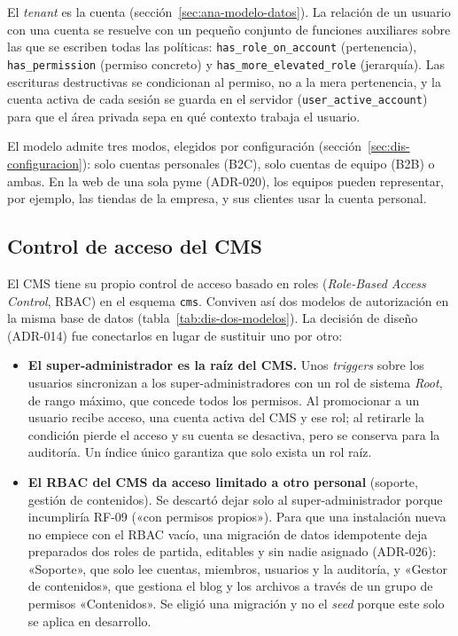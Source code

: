 El \textit{tenant} es la cuenta (sección~\ref{sec:ana-modelo-datos}). La
relación de un usuario con una cuenta se resuelve con un pequeño conjunto de
funciones auxiliares sobre las que se escriben todas las políticas:
\texttt{has\_role\_on\_account} (pertenencia), \texttt{has\_permission}
(permiso concreto) y \texttt{has\_more\_elevated\_role} (jerarquía). Las
escrituras destructivas se condicionan al permiso, no a la mera pertenencia,
y la cuenta activa de cada sesión se guarda en el servidor
(\texttt{user\_active\_account}) para que el área privada sepa en qué
contexto trabaja el usuario.

El modelo admite tres modos, elegidos por configuración
(sección~\ref{sec:dis-configuracion}): solo cuentas personales (B2C), solo
cuentas de equipo (B2B) o ambas. En la web de una sola pyme (ADR-020), los
equipos pueden representar, por ejemplo, las tiendas de la empresa, y sus
clientes usar la cuenta personal.

\subsection{Control de acceso del CMS}
\label{sec:dis-rbac-cms}

El CMS tiene su propio control de acceso basado en roles
(\textit{Role-Based Access Control}, RBAC) en el esquema \texttt{cms}. Conviven
así dos modelos de autorización en la misma base de datos
(tabla~\ref{tab:dis-dos-modelos}). La decisión de diseño (ADR-014) fue
conectarlos en lugar de sustituir uno por otro:

\begin{itemize}
  \item \textbf{El super-administrador es la raíz del CMS.} Unos
        \textit{triggers} sobre los usuarios sincronizan a los
        super-administradores con un rol de sistema \emph{Root}, de rango
        máximo, que concede todos los permisos. Al promocionar a un usuario
        recibe acceso, una cuenta activa del CMS y ese rol; al retirarle la
        condición pierde el acceso y su cuenta se desactiva, pero se conserva
        para la auditoría. Un índice único garantiza que solo exista un rol
        raíz.
  \item \textbf{El RBAC del CMS da acceso limitado a otro personal}
        (soporte, gestión de contenidos). Se descartó dejar solo al
        super-administrador porque incumpliría RF-09 («con permisos
        propios»). Para que una instalación nueva no empiece con el RBAC
        vacío, una migración de datos idempotente deja preparados dos roles
        de partida, editables y sin nadie asignado (ADR-026): «Soporte»,
        que solo lee cuentas, miembros, usuarios y la auditoría, y «Gestor
        de contenidos», que gestiona el blog y los archivos a través de un
        grupo de permisos «Contenidos». Se eligió una migración y no el
        \textit{seed} porque este solo se aplica en desarrollo.
\end{itemize}


